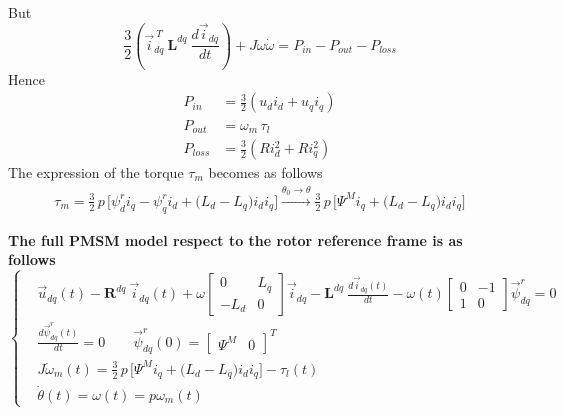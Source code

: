 \documentclass[12pt,a4paper,oneside]{book}
\begin{document}
\begin{onehalfspace}
\begin{equation*}
\end{equation*}
But 
\begin{equation*}
	\frac{3}{2} \left( \vec{i}_{dq}^{\ T}\ \mathbf{L}^{dq}\ 
	\frac{d\vec{i}_{dq}}{dt}\right) + J\omega\dot{\omega}= 
	P_{in}-P_{out}-P_{loss}
\end{equation*}
Hence
\begin{equation*}
	\begin{aligned}
		P_{in} &= \frac{3}{2}\left( u_d i_d+u_q i_q\right)  \\[6pt]
		P_{out} &= \omega_m\,\tau_l \\[6pt]
		P_{loss} &= \frac{3}{2}\left( Ri_d^2+Ri_q^2\right) 
	\end{aligned} 
\end{equation*}
The expression of the torque $\tau_m$ becomes as follows
\begin{equation}
	\begin{aligned}
		\tau_m = \frac{3}{2}\,p\,\Big[\psi^r_{d}i_{q}-\psi^r_{q}i_{d} + 
		\big(L_d-L_q\big)i_di_q\Big] 
		\xrightarrow{\theta_0\rightarrow\theta} 
		\frac{3}{2}\,p\,\Big[\Psi^Mi_{q}
		+ \big(L_d-L_q\big)i_di_q\Big]
	\end{aligned} 
\end{equation}

\begin{mybox}
	\textbf{The full PMSM model respect to the rotor reference frame is as 
		follows}
	\begin{equation}\label{twophase_model_ref_2}
		\left\lbrace \begin{aligned}
			& \vec{u}_{dq}(t)-\mathbf{R}^{dq}\ \vec{i}_{dq}(t)+ 
			\omega\begin{bmatrix} 0 & L_q\\ -L_d & 0 
			\end{bmatrix}\vec{i}_{dq} -\mathbf{L}^{dq}\ 
			\frac{d\vec{i}_{dq}(t)}{dt}-\omega(t) \begin{bmatrix} 0 & -1 \\ 
				1 & 0\end{bmatrix} \vec{\psi}^r_{dq} = 0 \\[6pt]
			& \frac{d\vec{\psi}^r_{dq}(t)}{dt} = 0 \qquad 
			\vec{\psi}^r_{dq}(0) = \begin{bmatrix} \Psi^M &  0 
			\end{bmatrix}^T \\[6pt]
			& J\dot{\omega}_m(t) = \frac{3}{2}\,p\,\Big[\Psi^Mi_{q} + 
			\big(L_d-L_q\big)i_di_q\Big] -\tau_l(t) \\[6pt]
			& \dot{\theta}(t) = \omega(t) = p\omega_m(t)
		\end{aligned} \right. 
	\end{equation}
\end{mybox}

\end{onehalfspace}
\end{document}
